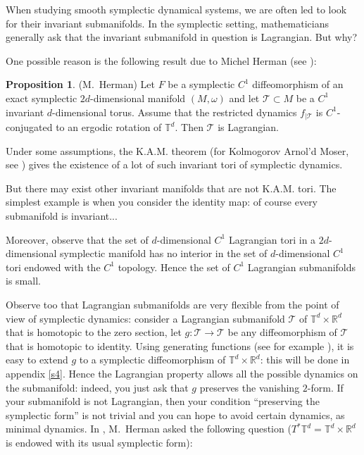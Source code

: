 \documentclass{dcds}
\theoremstyle{definition}
\newtheorem*{propo}{Proposition}
\begin{document}
When studying smooth symplectic  dynamical systems, we are often led to look for  their invariant submanifolds.  In the symplectic setting, mathematicians generally ask that the invariant submanifold in question is Lagrangian. But why?

One possible reason is the following result due to Michel Herman (see \cite{He1}):
\begin{propo}(M.~Herman) Let $F$ be a   symplectic $C^1$ diffeomorphism of an exact symplectic $2d$-dimensional manifold $(M, \omega)$ and let ${\mathcal {T}}\subset M$ be a $C^1$ invariant $d$-dimensional torus. Assume that the restricted dynamics $f_{|{\mathcal {T}}}$ is $C^1$-conjugated to an ergodic rotation of ${\mathbb {T}}^d$. Then ${\mathcal {T}}$ is Lagrangian.
\end{propo}
Under some assumptions, the K.A.M. theorem (for Kolmogorov Arnol'd Moser, see \cite{Bo}) gives the existence of a lot of such invariant tori of  symplectic dynamics.

But there may exist other invariant manifolds that are not K.A.M. tori.  The simplest example is when you consider the identity map: of course every submanifold is invariant... 

Moreover, observe that the set of $d$-dimensional $C^1$ Lagrangian tori in a $2d$-dimensional symplectic manifold has no interior in the set of  $d$-dimensional $C^1$ tori endowed with the $C^1$ topology. Hence the set of $C^1$ Lagrangian submanifolds is small.

Observe too that Lagrangian submanifolds are very flexible from the point of view of symplectic dynamics:
 consider a Lagrangian submanifold ${\mathcal {T}}$ of ${\mathbb {T}}^d\times {\mathbb {R}}^d$ that is homotopic to the zero section, let $g: {\mathcal {T}}\rightarrow {\mathcal {T}}$ be any diffeomorphism of ${\mathcal {T}}$ that is homotopic to identity. Using generating functions (see for example \cite{AA}), it is easy to extend $g$ to a symplectic diffeomorphism of ${\mathbb {T}}^d\times {\mathbb {R}}^d$: this will be done in appendix \ref{s4}. Hence the Lagrangian property allows all the possible dynamics on the submanifold: indeed, you just ask that $g$ preserves the vanishing $2$-form. If your submanifold is not Lagrangian, then your condition ``preserving the symplectic form'' is not trivial and you can hope to avoid certain dynamics, as minimal dynamics. In \cite{He1}, M.~Herman asked the following question ($T^*{\mathbb {T}}^d={\mathbb {T}}^d\times {\mathbb {R}}^d$ is endowed with its usual symplectic form):
\end{document}
